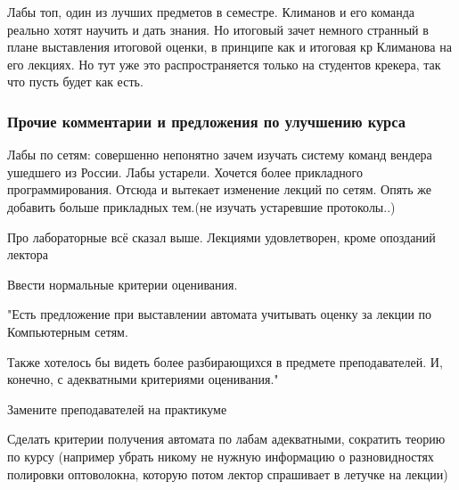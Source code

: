             \begin{commentbox} 
                Лабы топ, один из лучших предметов в семестре. Климанов и его команда реально хотят научить и дать знания. Но итоговый зачет немного странный в плане выставления итоговой оценки, в принципе как и итоговая кр Климанова на его лекциях. Но тут уже это распространяется только на студентов крекера, так что пусть будет как есть. 
            \end{commentbox} 
                

    \subsubsection{Прочие комментарии и предложения по улучшению курса}
        \begin{commentbox}
            Лабы по сетям: совершенно непонятно зачем изучать систему команд вендера ушедшего из России. Лабы устарели. Хочется более прикладного программирования. Отсюда и вытекает изменение лекций по сетям. Опять же добавить больше прикладных тем.(не изучать устаревшие протоколы..)
        \end{commentbox}

		\begin{commentbox}
			Про лабораторные всё сказал выше. Лекциями удовлетворен, кроме опозданий лектора
		\end{commentbox}

        \begin{commentbox}
			Ввести нормальные критерии оценивания. 
		\end{commentbox}

        \begin{commentbox}
			"Есть предложение при выставлении автомата учитывать оценку за лекции по Компьютерным сетям.

            Также хотелось бы видеть более разбирающихся в предмете преподавателей. И, конечно, с адекватными критериями оценивания."
		\end{commentbox}

        \begin{commentbox}
			Замените преподавателей на практикуме
		\end{commentbox}

        \begin{commentbox}
			Сделать критерии получения автомата по лабам адекватными, сократить теорию по курсу (например убрать никому не нужную информацию о разновидностях полировки оптоволокна, которую потом лектор спрашивает в летучке на лекции)
		\end{commentbox}

